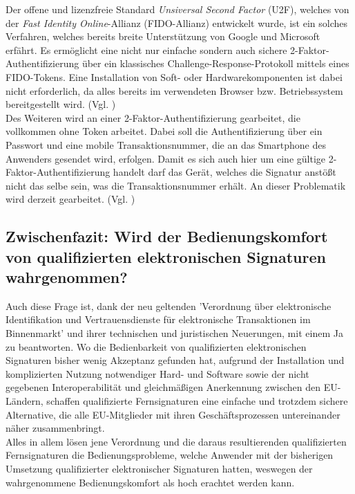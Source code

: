 \documentclass[deutsch]{lib/llncs/llncs}
\begin{document}
Der offene und lizenzfreie Standard \textit{Unsiversal Second Factor} (U2F), welches von der \textit{Fast Identity Online}-Allianz (FIDO-Allianz) entwickelt wurde, ist ein solches Verfahren, welches bereits breite Unterstützung von Google und Microsoft erfährt. Es ermöglicht eine nicht nur einfache sondern auch sichere 2-Faktor-Authentifizierung über ein klassisches Challenge-Response-Protokoll mittels eines FIDO-Tokens. Eine Installation von Soft- oder Hardwarekomponenten ist dabei nicht erforderlich, da alles bereits im verwendeten  Browser bzw. Betriebssystem bereitgestellt wird. (Vgl. \cite[S. 234]{Zitat09}) \\
Des Weiteren wird an einer 2-Faktor-Authentifizierung gearbeitet, die vollkommen ohne Token arbeitet. Dabei soll die Authentifizierung über ein Passwort und eine mobile Transaktionsnummer, die an das Smartphone des Anwenders gesendet wird, erfolgen. Damit es sich auch hier um eine gültige 2-Faktor-Authentifizierung handelt darf das Gerät, welches die Signatur anstößt nicht das selbe sein, was die Transaktionsnummer erhält. An dieser Problematik wird derzeit gearbeitet. (Vgl. \cite[S. 32]{Zitat08})


\subsection{Zwischenfazit: Wird der Bedienungskomfort von qualifizierten elektronischen Signaturen wahrgenommen?}
Auch diese Frage ist, dank der neu geltenden 'Verordnung über elektronische Identifikation und Vertrauensdienste für elektronische Transaktionen im Binnenmarkt' und ihrer technischen und juristischen Neuerungen, mit einem Ja zu beantworten. Wo die Bedienbarkeit von qualifizierten elektronischen Signaturen bisher wenig Akzeptanz gefunden hat, aufgrund der Installation und komplizierten Nutzung notwendiger Hard- und Software sowie der nicht gegebenen Interoperabilität und gleichmäßigen Anerkennung zwischen den EU-Ländern, schaffen qualifizierte Fernsignaturen eine einfache und trotzdem sichere Alternative, die alle EU-Mitglieder mit ihren Geschäftsprozessen untereinander näher zusammenbringt. \\
Alles in allem lösen jene Verordnung und die daraus resultierenden qualifizierten Fernsignaturen die Bedienungsprobleme, welche Anwender mit der bisherigen Umsetzung qualifizierter elektronischer Signaturen hatten, weswegen der wahrgenommene Bedienungskomfort als hoch erachtet werden kann.
\end{document}
